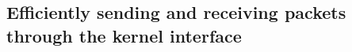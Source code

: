 \documentclass[11pt,a4paper,british]{bhamarticle}
\begin{document}
\begin{multicols}{2}
\subsection{Efficiently sending and receiving packets through the kernel interface}
\cite{tpacket} %


\printbibliography %
\end{multicols}
\end{document}
